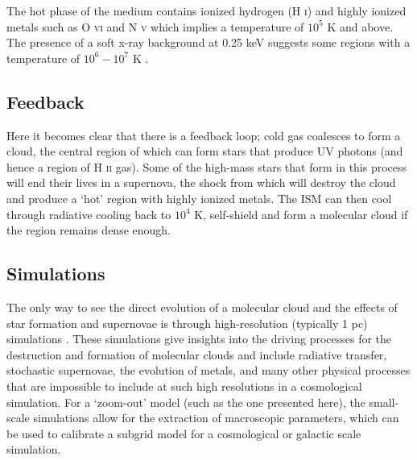 The hot phase of the medium contains ionized hydrogen (H \textsc{i}) and highly ionized metals such as O \textsc{vi} and N \textsc{v} which implies a temperature of $10^{5}$ K and above. The presence of a soft x-ray background at 0.25 keV suggests some regions with a temperature of $10^6 - 10^7$ K \citep{ferriere_interstellar_2001}.

\subsection{Feedback}

Here it becomes clear that there is a feedback loop; cold gas coalesces to form a cloud, the central region of which can form stars that produce UV photons (and hence a region of H \textsc{ii} gas).
Some of the high-mass stars that form in this process will end their lives in a supernova, the shock from which will destroy the cloud and produce a `hot' region with highly ionized metals.
The ISM can then cool through radiative cooling back to $10^4$ K, self-shield and form a molecular cloud if the region remains dense enough.

\subsection{Simulations} 

The only way to see the direct evolution of a molecular cloud and the effects of star formation and supernovae is through high-resolution (typically 1 pc) simulations \citep{martizzi_supernova_2015, girichidis_silcc_2016}.
These simulations give insights into the driving processes for the destruction and formation of molecular clouds and include radiative transfer, stochastic supernovae, the evolution of metals, and many other physical processes that are impossible to include at such high resolutions in a cosmological simulation.
For a `zoom-out' model (such as the one presented here), the small-scale simulations allow for the extraction of macroscopic parameters, which can be used to calibrate a subgrid model for a cosmological or galactic scale simulation.

\begin{table}[hb]
    \centering
    \caption{Overview of the typical densities of the different phases of gas in the ISM, with $T$ the temperature and $\rho$ the gaseous gas density. Data adapted from \citet{ferriere_interstellar_2001}.}
    \label{tab:ism}
\end{table}
